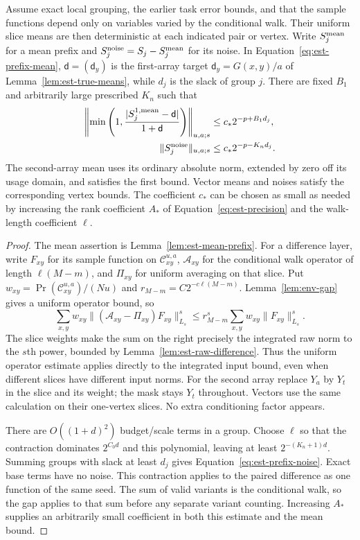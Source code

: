 \begin{lemma}\label{lem:est-prefix}
Assume exact local grouping, the earlier task error bounds, and that the
sample functions depend only on variables varied by the conditional walk.
Their uniform slice means are then deterministic at each indicated pair
or vertex.  Write $S_j^{\rm mean}$ for a mean prefix and
$S_j^{\rm noise}=S_j-S_j^{\rm mean}$ for its noise.  In
Equation~\eqref{eq:est-prefix-mean}, $\mathsf{d}=(\mathsf{d}_y)$ is the first-array target
$\mathsf{d}_y=G(x,y)/a$ of Lemma~\ref{lem:est-true-means}, while $d_j$ is the slack
of group $j$.  There are fixed
$B_1$ and arbitrarily large prescribed $K_n$ such that
\begin{align}
 \left\|\min\left(1,
       \frac{|S_j^{1,\rm mean}-\mathsf{d}|}{1+\mathsf{d}}\right)\right\|_{u,a;s}
       &\le c_*2^{-p+B_1d_j},
       \label{eq:est-prefix-mean}\\
 \|S_j^{\rm noise}\|_{u,a;s}
       &\le c_*2^{-p-K_nd_j}.
       \label{eq:est-prefix-noise}
\end{align}
The second-array mean uses its ordinary absolute norm, extended by zero
off its usage domain, and satisfies the first bound.  Vector means and
noises satisfy the corresponding vertex bounds.  The coefficient $c_*$
can be chosen as small as needed by increasing the rank coefficient $A_*$
of Equation~\eqref{eq:est-precision} and the walk-length coefficient
$\ell$.
\end{lemma}
\begin{proof}
The mean assertion is Lemma~\ref{lem:est-mean-prefix}.
For a difference layer, write $F_{xy}$ for its sample function on
$\mathcal C_{xy}^{u,a}$, $\mathcal A_{xy}$ for the conditional walk
operator of length $\ell(M-m)$, and $\Pi_{xy}$ for uniform averaging
on that slice.  Put
$w_{xy}=\Pr(\mathcal C_{xy}^{u,a})/(Nu)$ and
$r_{M-m}=C2^{-c\ell(M-m)}$.
Lemma~\ref{lem:env-gap} gives a uniform operator bound, so
\[
 \sum_{x,y}w_{xy}
   \|(\mathcal A_{xy}-\Pi_{xy})F_{xy}\|_{L_s}^s
 \le r_{M-m}^s
   \sum_{x,y}w_{xy}\|F_{xy}\|_{L_s}^s.
\]
The slice weights make the sum on the right precisely the integrated raw
norm to the $s$th power, bounded by Lemma~\ref{lem:est-raw-difference}.
Thus the uniform operator estimate applies directly to the integrated
input bound, even when different slices have different input norms.
For the second array replace $Y_a$ by $Y_t$ in the slice and its
weight; the mask stays $Y_t$ throughout.  Vectors use the same
calculation on their one-vertex slices.  No extra conditioning factor
appears.

There are $O((1+d)^2)$ budget/scale terms in a group.  Choose $\ell$ so
that the contraction dominates $2^{C_0d}$ and this polynomial, leaving
at least $2^{-(K_n+1)d}$.  Summing groups with slack at least $d_j$ gives
Equation~\eqref{eq:est-prefix-noise}.  Exact base terms have no noise.
This contraction applies to the paired difference as one function of the
same seed.  The sum of valid variants is the conditional walk, so the
gap applies to that sum before any separate variant counting.
Increasing $A_*$ supplies an
arbitrarily small coefficient in both this estimate and the mean bound.
\end{proof}

